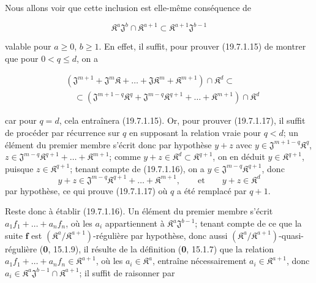 Nous allons voir que cette inclusion est elle-même conséquence de
\begin{env}[19.7.1.16]
\label{IV.19.7.1.16}
\[
  \mathfrak K^a\mathfrak J^b\cap\mathfrak K^{a+1}\subset\mathfrak K^{a+1}\mathfrak J^{b-1}
\]
\end{env}
valable pour $a\geq0$, $b\geq1$. En effet, il suffit, pour prouver (19.7.1.15) de montrer que pour $0<q\leq d$, on a
\begin{env}[19.7.1.17]
\label{IV.19.7.1.17}
\[
\begin{aligned}
  &(\mathfrak J^{m+1}+\mathfrak J^m\mathfrak K+\ldots+\mathfrak J\mathfrak K^m+\mathfrak K^{m+1})\cap\mathfrak K^d\subset\\
  &\quad\subset(\mathfrak J^{m+1-q}\mathfrak K^q+\mathfrak J^{m-q}\mathfrak K^{q+1}+\ldots+\mathfrak K^{m+1})\cap\mathfrak K^d
\end{aligned}
\]
\end{env}
car pour $q=d$, cela entraînera (19.7.1.15). Or, pour prouver (19.7.1.17), il suffit de procéder par récurrence sur $q$ en supposant la relation vraie pour $q<d$; un élément du premier membre s'écrit donc par hypothèse $y+z$ avec $y\in\mathfrak J^{m+1-q}\mathfrak K^q$, $z\in\mathfrak J^{m-q}\mathfrak K^{q+1}+\ldots+\mathfrak K^{m+1}$; comme $y+z\in\mathfrak K^d\subset\mathfrak K^{q+1}$, on en déduit $y\in\mathfrak K^{q+1}$, puisque $z\in\mathfrak K^{q+1}$; tenant compte de (19.7.1.16), on a $y\in\mathfrak J^{m-q}\mathfrak K^{q+1}$, donc
\[
  y+z\in\mathfrak J^{m-q}\mathfrak K^{q+1}+\ldots+\mathfrak K^{m+1},\qquad\text{et}\qquad y+z\in\mathfrak K^d
\]
par hypothèse, ce qui prouve (19.7.1.17) où $q$ a été remplacé par $q+1$.

Reste donc à établir (19.7.1.16). Un élément du premier membre s'écrit $a_1f_1+\ldots+a_nf_n$, où les $a_i$ appartiennent à $\mathfrak K^a\mathfrak J^{b-1}$; tenant compte de ce que la suite $\mathbf f$ est $(\mathfrak K^a/\mathfrak K^{a+1})$-régulière par hypothèse, donc aussi $(\mathfrak K^a/\mathfrak K^{a+1})$-quasi-régulière (\textbf{0}, 15.1.9), il résulte de la définition (\textbf{0}, 15.1.7) que la relation $a_1f_1+\ldots+a_nf_n\in\mathfrak K^{a+1}$, où les $a_i\in\mathfrak K^a$, entraîne nécessairement $a_i\in\mathfrak K^{a+1}$, donc $a_i\in\mathfrak K^a\mathfrak J^{b-1}\cap\mathfrak K^{a+1}$; il suffit de raisonner par

